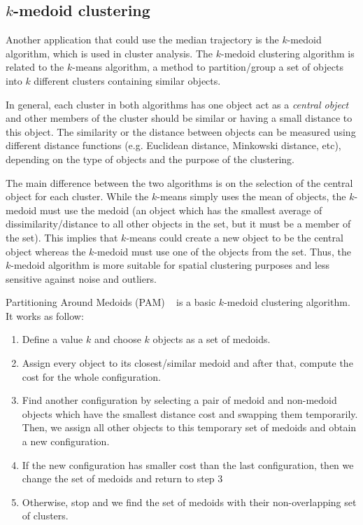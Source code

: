 \subsection{\texorpdfstring{$k$}{k}-medoid clustering}
Another application that could use the median trajectory is the $k$-medoid algorithm, which is used in cluster analysis.
The $k$-medoid clustering algorithm is related to the $k$-means algorithm, a method to partition/group a set of objects into $k$ different clusters containing similar objects.

In general, each cluster in both algorithms has one object act as a \textit{central object} and other members of the cluster should be similar or having a small distance to this object.
The similarity or the distance between objects can be measured using different distance functions (e.g. Euclidean distance, Minkowski distance, etc), depending on the type of objects and the purpose of the clustering.

The main difference between the two algorithms is on the selection of the central object for each cluster. 
While the $k$-means simply uses the mean of objects, the $k$-medoid must use the medoid (an object which has the smallest average of dissimilarity/distance to all other objects in the set, but it must be a member of the set). 
This implies that $k$-means could create a new object to be the central object whereas the $k$-medoid must use one of the objects from the set.
Thus, the $k$-medoid algorithm is more suitable for spatial clustering purposes and less sensitive against noise and outliers.  

Partitioning Around Medoids (PAM) ~\cite{Kaufman:2005} is a basic $k$-medoid clustering algorithm.
It works as follow:
\begin{enumerate}
\item
Define a value $k$ and choose $k$ objects as a set of medoids.
\item
Assign every object to its closest/similar medoid and after that, compute the cost for the whole configuration.  
\item
Find another configuration by selecting a pair of medoid and non-medoid objects which have the smallest distance cost and swapping them temporarily.
Then, we assign all other objects to this temporary set of medoids and obtain a new configuration.
\item
If the new configuration has smaller cost than the last configuration, then we change the set of medoids and return to step 3
\item
Otherwise, stop and we find the set of medoids with their non-overlapping set of clusters.
\end{enumerate}

